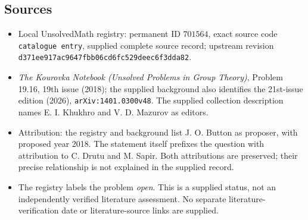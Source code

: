 \documentclass[11pt]{article}
\begin{document}
\subsection{Sources}
\begin{itemize}
\item Local UnsolvedMath registry: permanent ID \(701564\), exact source code \texttt{catalogue entry}, supplied complete source record; upstream revision \texttt{d371ee917ac9647fbb06cd6fc529deec6f3dda82}.
\item \emph{The Kourovka Notebook (Unsolved Problems in Group Theory)}, Problem 19.16, 19th issue (2018); the supplied background also identifies the 21st-issue edition (2026), \texttt{arXiv:1401.0300v48}. The supplied collection description names E. I. Khukhro and V. D. Mazurov as editors.
\item Attribution: the registry and background list J. O. Button as proposer, with proposed year 2018. The statement itself prefixes the question with attribution to C. Drutu and M. Sapir. Both attributions are preserved; their precise relationship is not explained in the supplied record.
\item The registry labels the problem \emph{open}. This is a supplied status, not an independently verified literature assessment. No separate literature-verification date or literature-source links are supplied.
\end{itemize}
\end{document}
